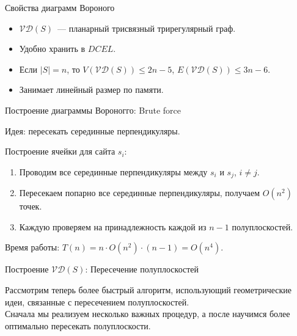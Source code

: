 \documentclass[12pt,aspectratio=169,svgnames]{beamer}
\begin{document}
    \begin{frame}{Свойства диаграмм Вороного}

        \begin{itemize}

            \item $\mathcal{V}\mathcal{D}(S)$~--- планарный трисвязный трирегулярный граф.

            \item Удобно хранить в $DCEL$.

            \item Если $|S| = n$, то $V(\mathcal{V}\mathcal{D}(S)) \le 2n - 5$, $E(\mathcal{V}\mathcal{D}(S)) \le 3n - 6$.

            \item Занимает линейный размер по памяти.

        \end{itemize}
    \end{frame}

    \begin{frame}{Построение диаграммы Вороногго: Brute force}

        \alert{Идея:} пересекать серединные перпендикуляры.

        Построение ячейки для сайта $s_i$:

        \begin{enumerate}
            \item Проводим все серединные перпендикуляры между $s_i$ и $s_j$, $i \neq j$.

            \item Пересекаем попарно все серединные перпендикуляры, получаем $O(n^2)$ точек.

            \item Каждую проверяем на принадлежность каждой из $n - 1$ полуплоскостей.

        \end{enumerate}

        Время работы: $T(n) = n \cdot O(n^2) \cdot (n - 1) = O(n^4)$.

    \end{frame}

    \begin{frame}{Построение $\mathcal{V}\mathcal{D}(S)$: Пересечение полуплоскостей}

        Рассмотрим теперь более быстрый алгоритм, использующий геометрические идеи, связанные с пересечением полуплоскостей. \\

        Сначала мы реализуем несколько важных процедур, а после научимся более оптимально пересекать полуплоскости.

    \end{frame}
\end{document}
